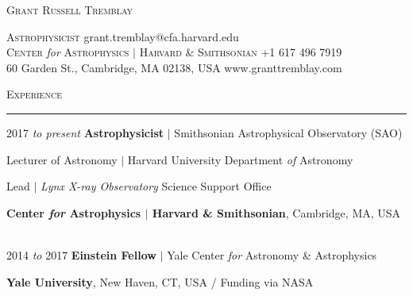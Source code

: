 \documentclass[11pt]{article}
\makeatletter
\def\vhrulefill#1{\leavevmode\leaders\hrule\@height#1\hfill \kern\z@}
\makeatother
\begin{document}
\thispagestyle{empty}

\begin{center}
\hspace*{0.5in}
{\Large \textsc{Grant Russell Tremblay}}\\
\end{center}
{\small
\hspace*{6mm}\textsc{Astrophysicist} \hfill grant.tremblay@cfa.harvard.edu\\
\hspace*{6mm}\textsc{Center} \textit{for} \textsc{Astrophysics $|$ Harvard \& Smithsonian}  \hfill +1 617 496 7919\\
\hspace*{6mm}60 Garden St., Cambridge, MA 02138, USA \hfill www.granttremblay.com\\}



\textsc{Experience} \vhrulefill{0.4pt}


\vspace{2mm}


\hspace{2.5mm} 2017 \textit{to present} \hspace{13.5mm} \textbf{Astrophysicist} $|$ Smithsonian Astrophysical Observatory (SAO)

\hspace{42mm} \parbox{5.15in}{Lecturer of Astronomy $|$ Harvard University Department \textit{of} Astronomy}

\hspace{42mm} \parbox{5.15in}{Lead $|$ \textit{Lynx X-ray Observatory} Science Support Office}



\hspace{42mm} \parbox{5.15in}{ \textbf{Center \textit{for} Astrophysics $|$ Harvard \& Smithsonian}, Cambridge, MA, USA}\\


\hspace{2.5mm} 2014 \textit{to} 2017 \hspace{17mm} \textbf{Einstein Fellow}
$|$ Yale Center \textit{for} Astronomy \& Astrophysics

\hspace{42mm} \parbox{5.15in}{\textbf{Yale University}, New Haven, CT, USA / Funding via NASA}\\
\end{document}
